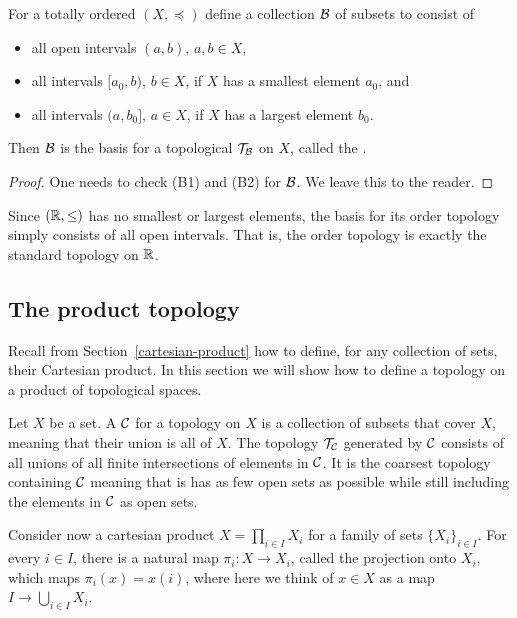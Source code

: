 \begin{prop}
  For a totally ordered $(X,\preceq)$ define a collection $\mathcal{B}$ of subsets to consist of
  \begin{itemize}
    \item all open intervals $(a,b)$, $a,b \in X$,
    \item all intervals $[a_0,b)$, $b \in X$, if $X$ has a smallest element $a_0$, and
    \item all intervals $(a,b_0]$, $a \in X$, if $X$ has a largest element $b_0$.
  \end{itemize}
  Then $\mathcal{B}$ is the basis for a topological $\mathcal{T}_{\mathcal{B}}$ on $X$, called the .
\end{prop}
\begin{proof}
  One needs to check (B1) and (B2) for $\mathcal{B}$. We leave this to the reader.
\end{proof}
\begin{example}
  Since $(\mathbb{R},\leq)$ has no smallest or largest elements, the basis for its order topology simply consists of all open intervals. That is, the order topology is exactly the standard topology on $\mathbb{R}$.
\end{example}

\subsection{The product topology}
Recall from Section~\ref{cartesian-product} how to define, for any collection of sets, their Cartesian product. In this section we will show how to define a topology on a product of topological spaces.

\begin{defn}
  Let $X$ be a set. A  $\mathcal{C}$ for a topology on $X$ is a collection of subsets that cover $X$, meaning that their union is all of $X$. The topology $\mathcal{T}_{\mathcal{C}}$ generated by $\mathcal{C}$ consists of all unions of all finite intersections of elements in $\mathcal{C}$. It is the coarsest topology containing $\mathcal{C}$ meaning that is has as few open sets as possible while still including the elements in $\mathcal{C}$ as open sets.
\end{defn}
Consider now a cartesian product $X = \prod_{i \in I} X_i$ for a family of sets $\{ X_i \}_{i \in I}$. For every $i \in I$, there is a natural map $\pi_i : X \to X_i$, called the projection onto $X_i$, which maps $\pi_i(x) = x(i)$, where here we think of $x \in X$ as a map $I \to \bigcup_{i \in I} X_i$.

